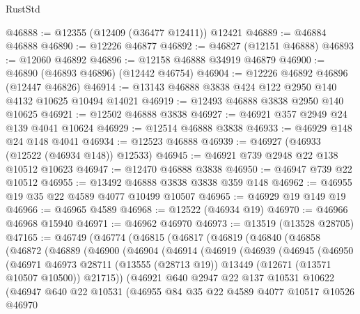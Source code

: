 \begin{lexlean}{RustStd}
\begin{coremodule}
@46888 := @12355 (@12409 (@36477 @12411)) @12421
@46889 := @46884 @46888
@46890 := @12226 @46877
@46892 := @46827 (@12151 @46888)
@46893 := @12060 @46892
@46896 := @12158 @46888 @34919 @46879
@46900 := @46890 (@46893 @46896) (@12442 @46754)
@46904 := @12226 @46892 @46896 (@12447 @46826)
@46914 := @13143 @46888 @3838 @424 @122 @2950 @140 @4132 @10625 @10494 @14021
@46919 := @12493 @46888 @3838 @2950 @140 @10625
@46921 := @12502 @46888 @3838
@46927 := @46921 @357 @2949 @24 @139 @4041 @10624
@46929 := @12514 @46888 @3838
@46933 := @46929 @148 @24 @148 @4041
@46934 := @12523 @46888
@46939 := @46927 (@46933 (@12522 (@46934 @148)) @12533)
@46945 := @46921 @739 @2948 @22 @138 @10512 @10623
@46947 := @12470 @46888 @3838
@46950 := @46947 @739 @22 @10512
@46955 := @13492 @46888 @3838 @3838 @359 @148
@46962 := @46955 @19 @35 @22 @4589 @4077 @10499 @10507
@46965 := @46929 @19 @149 @19
@46966 := @46965 @4589
@46968 := @12522 (@46934 @19)
@46970 := @46966 @46968 @15940
@46971 := @46962 @46970
@46973 := @13519 (@13528 @28705)
@47165 := @46749
    (@46774
      (@46815
        (@46817
          (@46819
            (@46840
              (@46858
                (@46872
                  (@46889
                    (@46900
                      (@46904
                        (@46914
                          (@46919
                            (@46939
                              (@46945
                                (@46950
                                  (@46971
                                    @46973
                                    @28711
                                    (@13555 (@28713 @19))
                                    @13449
                                    (@12671 (@13571 @10507 @10500))
                                    @21715))
                                (@46921
                                  @640
                                  @2947
                                  @22
                                  @137
                                  @10531
                                  @10622
                                  (@46947
                                    @640
                                    @22
                                    @10531
                                    (@46955
                                      @84
                                      @35
                                      @22
                                      @4589
                                      @4077
                                      @10517
                                      @10526
                                      @46970

\end{coremodule}
\end{lexlean}
